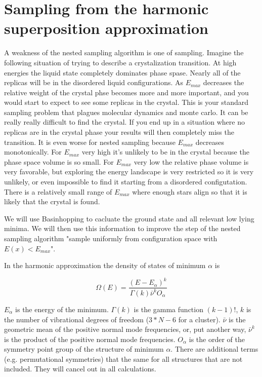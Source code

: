 \documentclass[a4paper]{article}
\begin{document}
\section{Sampling from the harmonic superposition approximation}

A weakness of the nested sampling algorithm is one of sampling.  Imagine the following situation
of trying to describe a crystalization transition.  At high energies the liquid state
completely dominates phase spase.  Nearly all of the replicas will be in the disordered liquid
configurations.  As $E_{max}$ decreases the relative weight of the crystal phse becomes more 
and more important, and you would start to expect to see some replicas in the crystal.  This is
your standard sampling problem that plagues molecular dynamics and monte carlo.
It can be really really difficult to find the crystal.  If you end up in a
situation where no replicas are in the crystal phase your results will then
completely miss the transition.  It is even worse for nested sampling because $E_{max}$ decreases
monotonically. For $E_{max}$ very high it's unlikely to be in the crystal because the phase space 
volume is so small.  For $E_{max}$ very low the relative phase volume is very
favorable, but exploring the energy landscape is very restricted so it is very
unlikely, or even impossible to find it starting from a disordered
configutation.  There is a relatively small range of $E_{max}$ where enough stars align so that
it is likely that the crystal is found.

We will use Basinhopping to cacluate the ground state and all relevant low lying minima.
We will then use this information to improve the step of the nested sampling
algorithm "sample uniformly from configuration space with $E(x) < E_{max}$".

In the harmonic approximation the density of states of minimum $\alpha$ is

\begin{equation}
  \Omega(E) = \frac{(E - E_\alpha)^k }{\Gamma(k) \bar{\nu}^k O_\alpha}
\end{equation}

$E_\alpha$ is the energy of the minimum.  $\Gamma(k)$ is the gamma function $(k-1)!$, $k$ is the number
of vibrational degrees of freedom ($3*N-6$ for a cluster).  $\bar{\nu}$ is the
geometric mean of the positive normal mode frequencies, or, put another way,
$\bar{\nu}^k$ is the product of the positive normal mode frequencies.  $O_\alpha$ is the order
of the symmetry point group of the structure of minimum $\alpha$.  There are additional terms (e.g.
permutational symmetries) that the same for all structures that are not included.  They will cancel
out in all calculations.
\end{document}
